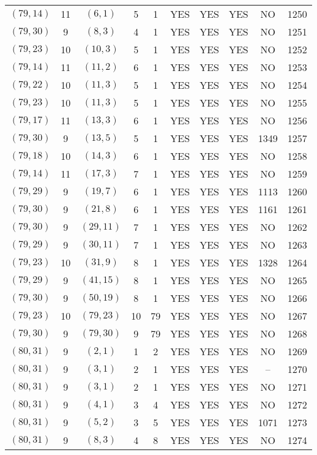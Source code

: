 \begin{longtable}{|c|c|c|c|c|c|c|c|c|c|}
$(79, 14)$ & 11 & $(6, 1)$ & 5 & 1 & YES & YES & YES & NO & 1250\\
$(79, 30)$ & 9 & $(8, 3)$ & 4 & 1 & YES & YES & YES & NO & 1251\\
$(79, 23)$ & 10 & $(10, 3)$ & 5 & 1 & YES & YES & YES & NO & 1252\\
$(79, 14)$ & 11 & $(11, 2)$ & 6 & 1 & YES & YES & YES & NO & 1253\\
$(79, 22)$ & 10 & $(11, 3)$ & 5 & 1 & YES & YES & YES & NO & 1254\\
$(79, 23)$ & 10 & $(11, 3)$ & 5 & 1 & YES & YES & YES & NO & 1255\\
$(79, 17)$ & 11 & $(13, 3)$ & 6 & 1 & YES & YES & YES & NO & 1256\\
$(79, 30)$ & 9 & $(13, 5)$ & 5 & 1 & YES & YES & YES & 1349 & 1257\\
$(79, 18)$ & 10 & $(14, 3)$ & 6 & 1 & YES & YES & YES & NO & 1258\\
$(79, 14)$ & 11 & $(17, 3)$ & 7 & 1 & YES & YES & YES & NO & 1259\\
$(79, 29)$ & 9 & $(19, 7)$ & 6 & 1 & YES & YES & YES & 1113 & 1260\\
$(79, 30)$ & 9 & $(21, 8)$ & 6 & 1 & YES & YES & YES & 1161 & 1261\\
$(79, 30)$ & 9 & $(29, 11)$ & 7 & 1 & YES & YES & YES & NO & 1262\\
$(79, 29)$ & 9 & $(30, 11)$ & 7 & 1 & YES & YES & YES & NO & 1263\\
$(79, 23)$ & 10 & $(31, 9)$ & 8 & 1 & YES & YES & YES & 1328 & 1264\\
$(79, 29)$ & 9 & $(41, 15)$ & 8 & 1 & YES & YES & YES & NO & 1265\\
$(79, 30)$ & 9 & $(50, 19)$ & 8 & 1 & YES & YES & YES & NO & 1266\\
$(79, 23)$ & 10 & $(79, 23)$ & 10 & 79 & YES & YES & YES & NO & 1267\\
$(79, 30)$ & 9 & $(79, 30)$ & 9 & 79 & YES & YES & YES & NO & 1268\\
$(80, 31)$ & 9 & $(2, 1)$ & 1 & 2 & YES & YES & YES & NO & 1269\\
$(80, 31)$ & 9 & $(3, 1)$ & 2 & 1 & YES & YES & YES & -- & 1270\\
$(80, 31)$ & 9 & $(3, 1)$ & 2 & 1 & YES & YES & YES & NO & 1271\\
$(80, 31)$ & 9 & $(4, 1)$ & 3 & 4 & YES & YES & YES & NO & 1272\\
$(80, 31)$ & 9 & $(5, 2)$ & 3 & 5 & YES & YES & YES & 1071 & 1273\\
$(80, 31)$ & 9 & $(8, 3)$ & 4 & 8 & YES & YES & YES & NO & 1274\\

\end{longtable}
